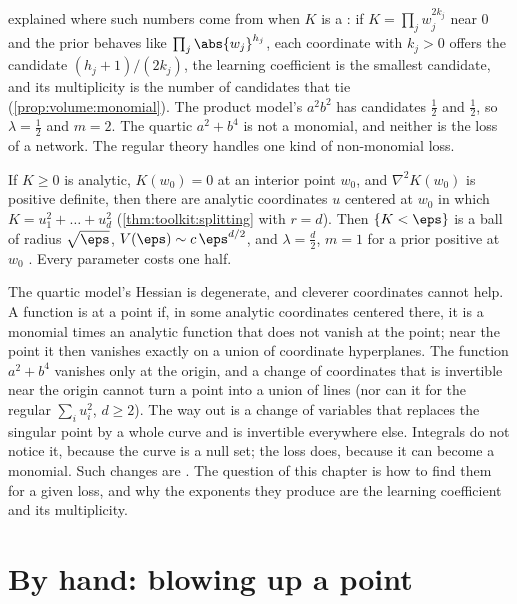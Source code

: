 \begin{refsection}
 explained where such numbers come from when $K$ is a : if $K=\prod_jw_j^{2k_j}$ near $0$ and the prior behaves like $\prod_j\abs{w_j}^{h_j}$, each coordinate with $k_j>0$ offers the candidate $(h_j+1)/(2k_j)$, the learning coefficient is the smallest candidate, and its multiplicity is the number of candidates that tie (\cref{prop:volume:monomial}). The product model's $a^2b^2$ has candidates $\frac12$ and $\frac12$, so $\lambda=\frac12$ and $m=2$. The quartic $a^2+b^4$ is not a monomial, and neither is the loss of a network. The regular theory handles one kind of non-monomial loss.

\begin{regularanswer}
If $K\ge0$ is analytic, $K(w_0)=0$ at an interior point $w_0$, and $\nabla^2K(w_0)$ is positive definite, then there are analytic coordinates $u$ centered at $w_0$ in which $K=u_1^2+\dots+u_d^2$ (\cref{thm:toolkit:splitting} with $r=d$). Then $\{K<\eps\}$ is a ball of radius $\sqrt\eps$, $V(\eps)\sim c\,\eps^{d/2}$, and $\lambda=\frac d2$, $m=1$ for a prior positive at $w_0$ \parencite[Lemma~3]{Watanabe2013}. Every parameter costs one half.
\end{regularanswer}

The quartic model's Hessian is degenerate, and cleverer coordinates cannot help. A function is  at a point if, in some analytic coordinates centered there, it is a monomial times an analytic function that does not vanish at the point; near the point it then vanishes exactly on a union of coordinate hyperplanes. The function $a^2+b^4$ vanishes only at the origin, and a change of coordinates that is invertible near the origin cannot turn a point into a union of lines (nor can it for the regular $\sum_iu_i^2$, $d\ge2$). The way out is a change of variables that replaces the singular point by a whole curve and is invertible everywhere else. Integrals do not notice it, because the curve is a null set; the loss does, because it can become a monomial. Such changes are . The question of this chapter is how to find them for a given loss, and why the exponents they produce are the learning coefficient and its multiplicity.

\section{By hand: blowing up a point}\label{sec:blowups:byhand}


\end{refsection}
